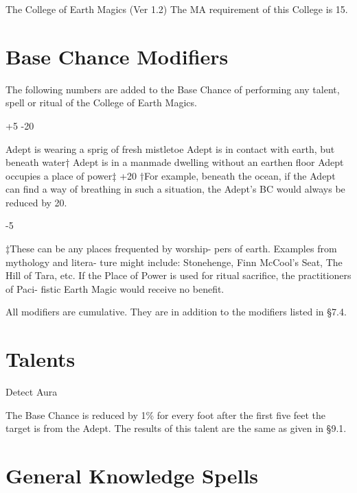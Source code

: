 \begin{Chapter}{The College of Earth Magics (Ver 1.2)}
The MA requirement of this College is 15. 


\section{Base Chance Modifiers}

The  following  numbers  are  added  to  the  Base 
Chance  of  performing  any  talent,  spell  or  ritual  of 
the College of Earth Magics. 

+5 
-20 

Adept is wearing a sprig of fresh mistletoe 
Adept is in contact with earth, but beneath 
water† 
Adept is in a manmade dwelling without an 
earthen floor 
Adept occupies a place of power‡ 
+20 
†For example, beneath the ocean, if the Adept can 
find  a  way  of  breathing  in  such  a  situation,  the 
Adept’s BC would always be reduced by 20. 

-5 

‡These  can  be  any  places  frequented  by  worship-
pers of earth. Examples from mythology and litera-
ture  might  include:  Stonehenge,  Finn  McCool’s 
Seat, The Hill of Tara, etc. If the Place of Power is 
used  for  ritual  sacrifice,  the  practitioners  of  Paci-
fistic Earth Magic would receive no benefit. 

All modifiers are cumulative. They are in addition 
to the modifiers listed in §7.4. 

\section{Talents}

\begin{talent}[T-1]{Detect Aura }


\begin{effects}
 The  Base  Chance  is  reduced  by  1\%  for 
every foot after the first five feet the target is from 
the Adept. The results of this talent are the same as 
given in §9.1. 


\end{effects}
\end{talent}

\section{General Knowledge Spells}


\end{Chapter}
